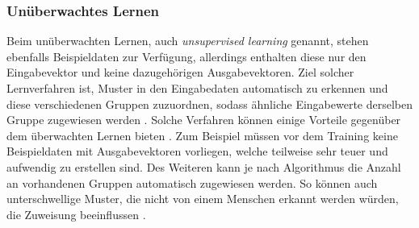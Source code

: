 \subsubsection{Unüberwachtes Lernen}
\label{subsubsec:unsupervised_learning}
Beim unüberwachten Lernen, auch \emph{unsupervised learning} genannt, stehen ebenfalls Beispieldaten zur Verfügung, allerdings enthalten diese nur den Eingabevektor und keine dazugehörigen Ausgabevektoren. Ziel solcher Lernverfahren ist, Muster in den Eingabedaten automatisch zu erkennen und diese verschiedenen Gruppen zuzuordnen, sodass ähnliche Eingabewerte derselben Gruppe zugewiesen werden \cite{zell2003simulation}. Solche Verfahren können einige Vorteile gegenüber dem überwachten Lernen bieten \cite{mahmad2005IEEE}. Zum Beispiel müssen vor dem Training keine Beispieldaten mit Ausgabevektoren vorliegen, welche teilweise sehr teuer und aufwendig zu erstellen sind. Des Weiteren kann je nach Algorithmus die Anzahl an vorhandenen Gruppen automatisch zugewiesen werden. So können auch unterschwellige Muster, die nicht von einem Menschen erkannt werden würden, die Zuweisung beeinflussen \cite{mahmad2005IEEE}.
 
